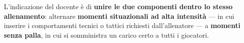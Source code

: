 L'indicazione del docente è di \textbf{unire le due componenti dentro lo stesso allenamento}:
alternare \textbf{momenti situazionali ad alta intensità} --- in cui inserire i comportamenti
tecnici o tattici richiesti dall'allenatore --- a \textbf{momenti senza palla}, in cui si
somministra un carico certo a tutti i giocatori.

